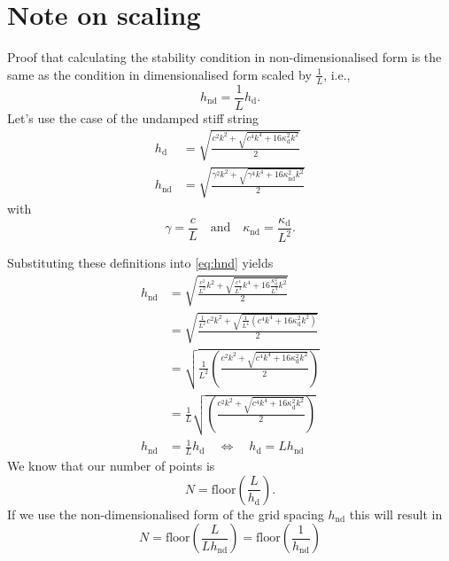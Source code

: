 \documentclass{article}
\begin{document}
\section{Note on scaling}
Proof that calculating the stability condition in non-dimensionalised form is the same as the condition in dimensionalised form scaled by $\frac{1}{L}$, i.e., 
\begin{equation}
    h_\text{nd} = \frac{1}{L}h_\text{d}.
\end{equation}
Let's use the case of the undamped stiff string
\begin{align}
    h_\text{d} &= \sqrt{\frac{c^2k^2 + \sqrt{c^4k^4 + 16\kappa_\text{d}^2k^2}}{2}} \label{eq:hd}\\
    h_\text{nd} &= \sqrt{\frac{\gamma^2k^2 + \sqrt{\gamma^4k^4 + 16\kappa_\text{nd}^2k^2}}{2}}\label{eq:hnd}
\end{align}
with
\begin{equation}
    \gamma = \frac{c}{L}\quad \text{and}\quad \kappa_\text{nd} = \frac{\kappa_\text{d}}{L^2}.
\end{equation}

Substituting these definitions into \eqref{eq:hnd} yields
\begin{align}
    h_\text{nd} &= \sqrt{\frac{\frac{c^2}{L^2}k^2 + \sqrt{\frac{c^4}{L^4}k^4 + 16\frac{\kappa_\text{d}^2}{L^4}k^2}}{2}}\nonumber\\
    &= \sqrt{\frac{\frac{1}{L^2}c^2k^2 + \sqrt{\frac{1}{L^4}\left(c^4k^4 + 16\kappa_\text{d}^2k^2\right)}}{2}}\nonumber\\
    &= \sqrt{\frac{1}{L^2}\left(\frac{c^2k^2 + \sqrt{c^4k^4 + 16\kappa_\text{d}^2k^2}}{2}\right)}\nonumber\\
    &= \frac{1}{L}\sqrt{\left(\frac{c^2k^2 + \sqrt{c^4k^4 + 16\kappa_\text{d}^2k^2}}{2}\right)}\nonumber\\
    h_\text{nd} &= \frac{1}{L}h_\text{d} \quad\Longleftrightarrow \quad h_\text{d} = Lh_\text{nd}
\end{align}
%
We know that our number of points is
\begin{equation}
    N = \text{floor}\left(\frac{L}{h_\text{d}}\right).
\end{equation}
If we use the non-dimensionalised form of the grid spacing $h_\text{nd}$ this will result in
\begin{equation}
    N = \text{floor}\left(\frac{L}{L h_\text{nd}}\right) = \text{floor}\left(\frac{1}{h_\text{nd}}\right)
\end{equation}
\end{document}
